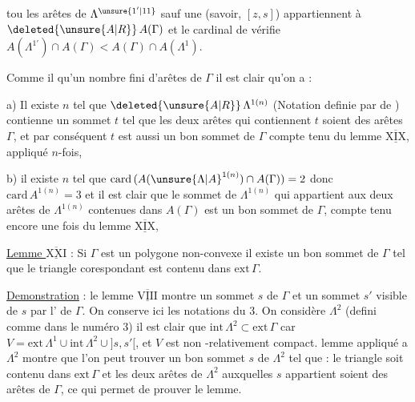 tou les  arêtes de $\Lambda^{\unsure{1'|11}}$ sauf une (savoir, $[z,s]$) appartiennent à $\deleted{\unsure{A|R}}\,A(\Gamma)$ et le cardinal de vérifie $A(\Lambda^{1'})\cap A(\Gamma)<A(\Gamma)\cap A(\Lambda^1)$.

Comme il  qu'un nombre fini d'arêtes de $\Gamma$ il est clair qu'on  a :

a) Il existe $n$ tel que $\deleted{\unsure{A|R}}\,\Lambda^{1(n)}$ (Notation definie par  de  ) contienne un  sommet $t$ tel que les deux arêtes qui contiennent $t$ soient des arêtes $\Gamma$, et par conséquent $t$ est aussi un bon sommet de $\Gamma$ compte tenu du lemme $\overline{\underline{\mathrm{XIX}}}$, appliqué $n$-fois, 

b) il existe $n$ tel que $\mathrm{card}\,(A({\unsure{\Lambda|A}}^{1(n)})\cap A(\Gamma))=2$ donc $\mathrm{card}\,A^{1(n)}=3$ et il est clair que le  sommet de $\Lambda^{1(n)}$ qui appartient aux deux arêtes de $\Lambda^{1(n)}$ contenues dans $A(\Gamma)$ est un bon sommet de $\Gamma$, compte tenu encore une fois du lemme $\overline{\underline{\mathrm{XIX}}}$, 

\uline{Lemme $\overline{\underline{\mathrm{XXI}}}$} : Si $\Gamma$ est un polygone non-convexe il existe un bon sommet de $\Gamma$ tel que le  triangle corespondant est contenu dans $\mathrm{ext}\,\Gamma$.

\uline{Demonstration} : le lemme $\overline{\underline{\mathrm{VIII}}}$ montre   un sommet $s$ de $\Gamma$ et un sommet $s'$ visible de $s$ par l' de $\Gamma$. On conserve ici les notations du  $3$. On considère $\Lambda^2$ (defini comme dans le numéro $3$) il est clair  %
que $\mathrm{int}\,\Lambda^2\subset\mathrm{ext}\,\Gamma$ car $V=\mathrm{ext}\,\Lambda^1\cup\mathrm{int}\,\Lambda^2\cup{]s,s'[}$, et $V$ est non -relativement compact.  lemme  appliqué a $\Lambda^2$ montre que l'on peut trouver un  bon sommet $s$ de $\Lambda^2$ tel que : le triangle  soit contenu dans $\mathrm{ext}\,\Gamma$ et les deux arêtes de $\Lambda^2$ auxquelles  %
$s$ appartient soient des arêtes de $\Gamma$, ce qui permet de prouver le lemme.

